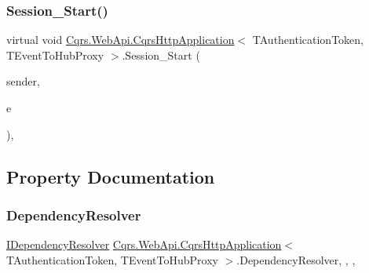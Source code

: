 \subsubsection{\texorpdfstring{Session\+\_\+\+Start()}{Session\_Start()}}
{\footnotesize\ttfamily virtual void \hyperlink{classCqrs_1_1WebApi_1_1CqrsHttpApplication}{Cqrs.\+Web\+Api.\+Cqrs\+Http\+Application}$<$ T\+Authentication\+Token, T\+Event\+To\+Hub\+Proxy $>$.Session\+\_\+\+Start (\begin{DoxyParamCaption}\item[{object}]{sender,  }\item[{Event\+Args}]{e }\end{DoxyParamCaption})\hspace{0.3cm}{\ttfamily [protected]}, {\ttfamily [virtual]}}



\subsection{Property Documentation}
\mbox{\label{classCqrs_1_1WebApi_1_1CqrsHttpApplication_a9d6bd681b84a94ae58abdb0b5cf2cbfd}} 
\subsubsection{\texorpdfstring{Dependency\+Resolver}{DependencyResolver}}
{\footnotesize\ttfamily \hyperlink{interfaceCqrs_1_1Configuration_1_1IDependencyResolver}{I\+Dependency\+Resolver} \hyperlink{classCqrs_1_1WebApi_1_1CqrsHttpApplication}{Cqrs.\+Web\+Api.\+Cqrs\+Http\+Application}$<$ T\+Authentication\+Token, T\+Event\+To\+Hub\+Proxy $>$.Dependency\+Resolver\hspace{0.3cm}{\ttfamily [static]}, {\ttfamily [get]}, {\ttfamily [set]}, {\ttfamily [protected]}}

